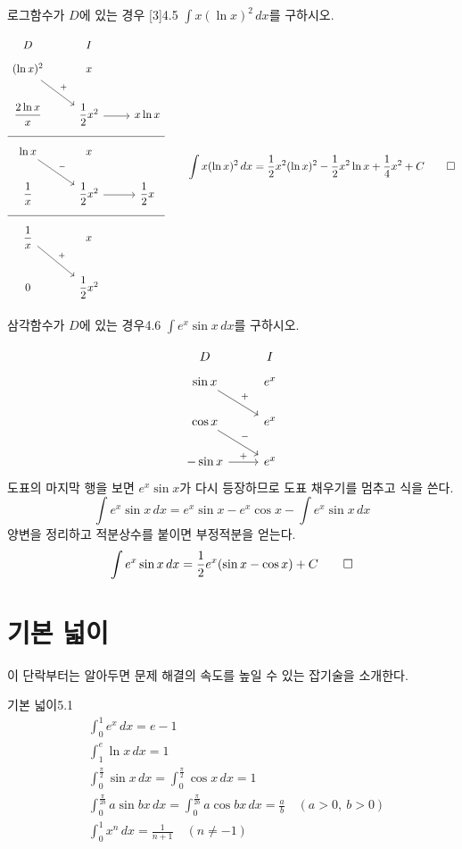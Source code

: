 \documentclass{article}
\begin{document}
\newpage
\begin{exc}{로그함수가 $D$에 있는 경우 [3]}{4.5}
	$\displaystyle\int x(\ln x)^2\,dx$를 구하시오.
\end{exc}

\begin{sol}
	\[
		\begin{tikzcd}
			D & I \\[-12pt]
			(\ln x)^2 \arrow[rd, "+"] & x & \\
			\dfrac{2\ln x}{x} & \dfrac{1}{2}x^2 \arrow[r] & x\ln x \\[-12pt] \hline \\[-12pt]
			\ln x \arrow[rd, "-"] & x & \\
			\dfrac{1}{x} & \dfrac{1}{2}x^2 \arrow[r] & \dfrac{1}{2}x \\[-12pt] \hline \\[-12pt]
			\dfrac{1}{x} \arrow[rd, "+"] & x & \\
			0 & \dfrac{1}{2}x^2 &
		\end{tikzcd}\qquad\int x(\ln x)^2\,dx=\frac{1}{2}x^2(\ln x)^2-\frac{1}{2}x^2\ln x+\frac{1}{4}x^2+C\qed
	\]
\end{sol}

\begin{exc}{삼각함수가 $D$에 있는 경우}{4.6}
	$\displaystyle\int e^x\sin x\,dx$를 구하시오.
\end{exc}

\begin{sol}
	\[
		\begin{tikzcd}
			D & I \\[-12pt]
			\sin x \arrow[rd, "+"] & e^x \\
			\cos x \arrow[rd, "-"] & e^x \\
			-\sin x \arrow[r, "+"] & e^x
		\end{tikzcd}
	\]
	도표의 마지막 행을 보면 $e^x\sin x$가 다시 등장하므로 도표 채우기를 멈추고 식을 쓴다.
	\[
		\int e^x\sin x\,dx =e^x\sin x-e^x \cos x-\int e^x\sin x\,dx
	\]
	양변을 정리하고 적분상수를 붙이면 부정적분을 얻는다.
	\[
		\int e^x\sin x\,dx =\frac{1}{2}e^x(\sin x-\cos x)+C\qed
	\]
\end{sol}

\newpage
\section{기본 넓이}
이 단락부터는 알아두면 문제 해결의 속도를 높일 수 있는 잡기술을 소개한다.

\begin{thm}{기본 넓이}{5.1}
	\begin{align}
		&\int_0^1e^x\,dx=e-1\\[6pt]
		&\int_1^e\ln x\,dx=1\\[6pt]
		&\int_0^{\tfrac{\pi}{2}}\sin x\,dx=\int_0^{\tfrac{\pi}{2}}\cos x\,dx=1\\[6pt]
		&\int_0^{\tfrac{\pi}{2b}}a\sin bx\,dx=\int_0^{\tfrac{\pi}{2b}}a\cos bx\,dx=\frac{a}{b}\quad(a>0,~b>0)\\[6pt]
		&\int_0^1x^n\,dx=\frac{1}{n+1}\quad (n\ne-1)
	\end{align}
\end{thm}
\end{document}
